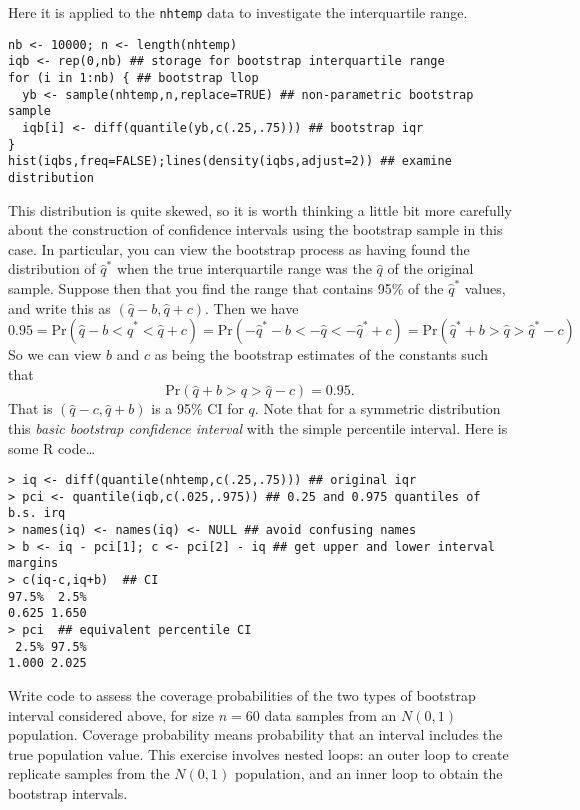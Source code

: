 \documentclass[10pt] {article}
\newcommand{\eps}[3]
{{\begin{center}
 \rotatebox{#1}{\scalebox{#2}{\texttt{[image: \#3]}}}
 \end{center}}
}
\theoremstyle{definition}
\begin{document}
Here it is applied to the {\tt nhtemp} data to investigate the interquartile range.  
\begin{lstlisting}
nb <- 10000; n <- length(nhtemp)
iqb <- rep(0,nb) ## storage for bootstrap interquartile range
for (i in 1:nb) { ## bootstrap llop
  yb <- sample(nhtemp,n,replace=TRUE) ## non-parametric bootstrap sample
  iqb[i] <- diff(quantile(yb,c(.25,.75))) ## bootstrap iqr
}
hist(iqbs,freq=FALSE);lines(density(iqbs,adjust=2)) ## examine distribution
\end{lstlisting}
\eps{-90}{.5}{nht-np-bs.eps}
This distribution is quite skewed, so it is worth thinking a little bit more carefully about the construction of confidence intervals using the bootstrap sample in this case. In particular, you can view the bootstrap process as having found the distribution of $\hat q^*$ when the true interquartile range was the $\hat q$ of the original sample. Suppose then that you find the range that contains 95\% of the $\hat q^*$ values, and write this as $(\hat q - b,\hat q + c)$. Then we have
$$
0.95 = \text{Pr}(\hat q - b < \hat q^* <\hat q + c) = \text{Pr}(-\hat q^* - b < -\hat q < -\hat q^* + c) = 
\text{Pr}(\hat q^* + b > \hat q > \hat q^* - c)
$$
So we can view $b$ and $c$ as being the bootstrap estimates of the constants such that 
$$
\text{Pr}(\hat q + b > q > \hat q - c) = 0.95.
$$
That is $(\hat q - c,\hat q +b)$ is a 95\% CI for $q$. Note that for a symmetric distribution this {\em basic bootstrap confidence interval} with the simple percentile interval. Here is some R code\ldots  {}
\begin{lstlisting}
> iq <- diff(quantile(nhtemp,c(.25,.75))) ## original iqr
> pci <- quantile(iqb,c(.025,.975)) ## 0.25 and 0.975 quantiles of b.s. irq
> names(iq) <- names(iq) <- NULL ## avoid confusing names
> b <- iq - pci[1]; c <- pci[2] - iq ## get upper and lower interval margins
> c(iq-c,iq+b)  ## CI
97.5%  2.5% 
0.625 1.650 
> pci  ## equivalent percentile CI
 2.5% 97.5% 
1.000 2.025 
\end{lstlisting}

\bigskip

 Write code to assess the coverage probabilities of the two types of bootstrap interval considered above, for size $n=60$ data samples from an $N(0,1)$ population. Coverage probability means probability that an interval includes the true population value. This exercise involves nested loops: an outer loop to create replicate samples from the $N(0,1)$ population, and an inner loop to obtain the bootstrap intervals.  
\end{document}
